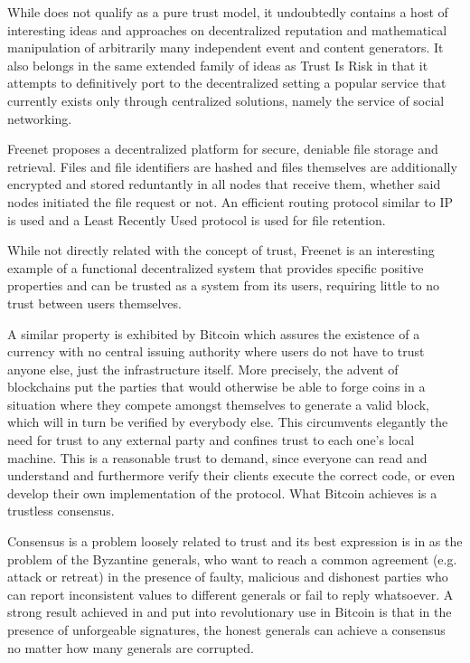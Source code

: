   While \cite{synereo} does not qualify as a pure trust model, it undoubtedly contains a host of interesting ideas and
  approaches on decentralized reputation and mathematical manipulation of arbitrarily many independent event and content
  generators. It also belongs in the same extended family of ideas as Trust Is Risk in that it attempts to definitively
  port to the decentralized setting a popular service that currently exists only through centralized solutions, namely the
  service of social networking.

  Freenet \cite{freenet} proposes a decentralized platform for secure, deniable file storage and retrieval. Files and file
  identifiers are hashed and files themselves are additionally encrypted and stored reduntantly in all nodes that receive
  them, whether said nodes initiated the file request or not. An efficient routing protocol similar to IP is used and a Least
  Recently Used protocol is used for file retention.

  While not directly related with the concept of trust, Freenet is an interesting example of a functional decentralized
  system that provides specific positive properties and can be trusted as a system from its users, requiring little to no
  trust between users themselves.

  A similar property is exhibited by Bitcoin \cite{bitcoin} which assures the existence of a currency with no central
  issuing authority where users do not have to trust anyone else, just the infrastructure itself. More precisely, the advent
  of blockchains put the parties that would otherwise be able to forge coins in a situation where they compete amongst
  themselves to generate a valid block, which will in turn be verified by everybody else. This circumvents elegantly the need
  for trust to any external party and confines trust to each one's local machine. This is a reasonable trust to demand, since
  everyone can read and understand \cite{bitcoin} and furthermore verify their clients execute the correct code, or even
  develop their own implementation of the protocol. What Bitcoin achieves is a trustless consensus.

  Consensus is a problem loosely related to trust and its best expression is in \cite{byzantine} as the problem of the
  Byzantine generals, who want to reach a common agreement (e.g. attack or retreat) in the presence of faulty, malicious and
  dishonest parties who can report inconsistent values to different generals or fail to reply whatsoever. A strong result
  achieved in \cite{byzantine} and put into revolutionary use in Bitcoin is that in the presence of unforgeable signatures,
  the honest generals can achieve a consensus no matter how many generals are corrupted.
